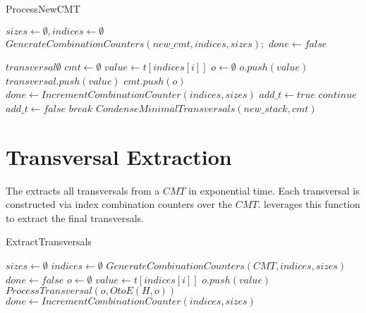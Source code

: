 \begin{algorithm}[H]
    \centering
	\caption{ProcessNewCMT}\label{ProcessNewCMT}
	\begin{algorithmic}[1]
		 {}
		\State $sizes \gets \emptyset, indices \gets \emptyset$
		\State $GenerateCombinationCounters(new\_cmt,indices,sizes);$
		\State $done \gets false$
		
		\State $transversal \emptyset$
		\State $cmt \gets \emptyset$
		\State $value \gets t[indices[i]]$
		\State $o \gets \emptyset$
		\State $o.push(value)$
		\State $transversal.push(value)$
		\State $cmt.push(o)$
		\EndFor
		\State $done \gets IncrementCombinationCounter(indices,sizes)$
		\State $add\_t \gets true$
		\State $continue$
		\EndIf
		\State $add\_t \gets false$
		\State $break$
		\EndIf
		\EndFor
		\State $CondenseMinimalTransversals(new\_stack,cmt)$
		\EndIf
		
		\EndWhile
		\EndFunction
	\end{algorithmic}
\end{algorithm}


\newpage
\section{Transversal Extraction}

The  extracts all transversals from a $CMT$ in exponential time. Each transversal is constructed via index combination counters over the $CMT$.   leverages this function to extract the final transversals. 

\begin{algorithm}[H]
    \centering
    \caption{ExtractTransversals}
    \label{ExtractTransversals}
   
	\begin{algorithmic}[1]
		\State $sizes \gets \emptyset$ 
		\State $indices \gets \emptyset$
		\State $GenerateCombinationCounters(CMT,indices,sizes)$
		\State $done \gets false$
		 {}
        	\State $o \gets \emptyset$
        	\State $value \gets t[indices[i]]$
        	\State $o.push(value)$
        	\EndFor
        	\State $ProcessTransversal(o,OtoE(H,o))$
        	\State $done \gets IncrementCombinationCounter(indices,sizes)$
		\EndWhile
		\EndFunction
	\end{algorithmic}
    
\end{algorithm}

